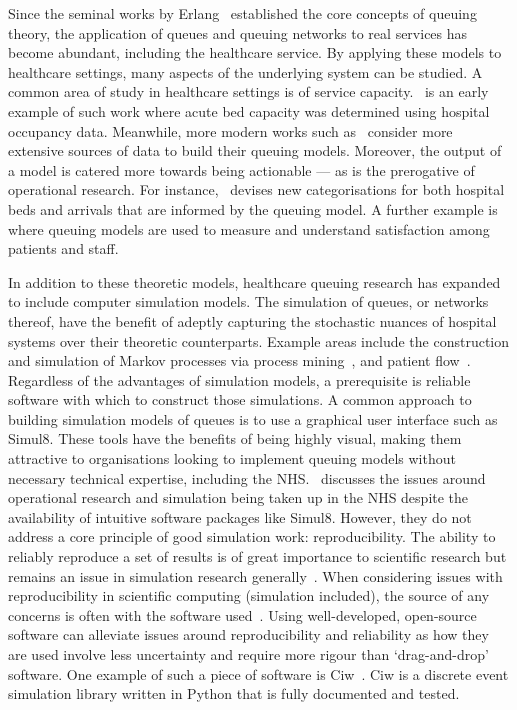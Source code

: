 Since the seminal works by Erlang~\cite{Erlang1917,Erlang1920} established the
core concepts of queuing theory, the application of queues and queuing networks
to real services has become abundant, including the healthcare service. By
applying these models to healthcare settings, many aspects of the underlying
system can be studied. A common area of study in healthcare settings is of
service capacity.~\cite{McClain1976} is an early example of such work where
acute bed capacity was determined using hospital occupancy data. Meanwhile, more
modern works such as~\cite{Palvannan2012,Pinto2014} consider more extensive
sources of data to build their queuing models.  Moreover, the output of a model
is catered more towards being actionable --- as is the prerogative of
operational research. For instance,~\cite{Pinto2014} devises new categorisations
for both hospital beds and arrivals that are informed by the queuing model. A
further example is~\cite{Komashie2015} where queuing models are used to measure
and understand satisfaction among patients and staff.

In addition to these theoretic models, healthcare queuing research has expanded
to include computer simulation models. The simulation of queues, or networks
thereof, have the benefit of adeptly capturing the stochastic nuances of
hospital systems over their theoretic counterparts. Example areas include the
construction and simulation of Markov processes via process
mining~\cite{Arnolds2018,Rebuge2012}, and patient flow~\cite{Bhattacharjee2014}.
Regardless of the advantages of simulation models, a prerequisite is reliable
software with which to construct those simulations. A common approach to
building simulation models of queues is to use a graphical user interface such
as Simul8. These tools have the benefits of being highly visual, making them
attractive to organisations looking to implement queuing models without
necessary technical expertise, including the NHS.~\cite{Brailsford2013}
discusses the issues around operational research and simulation being taken up
in the NHS despite the availability of intuitive software packages like Simul8.
However, they do not address a core principle of good simulation work:
reproducibility. The ability to reliably reproduce a set of results is of great
importance to scientific research but remains an issue in simulation research
generally~\cite{Fitzpatrick2019}. When considering issues with reproducibility
in scientific computing (simulation included), the source of any concerns is
often with the software used~\cite{Ivie2018}. Using well-developed, open-source
software can alleviate issues around reproducibility and reliability as how they
are used involve less uncertainty and require more rigour than ‘drag-and-drop’
software. One example of such a piece of software is Ciw~\cite{Palmer2019}. Ciw
is a discrete event simulation library written in Python that is fully
documented and tested. 
